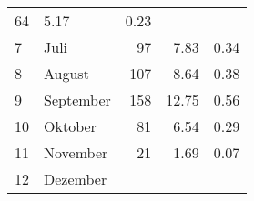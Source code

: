 \begin{longtable}{lXrrr}
       \num{64} &
       \num[round-mode=places,round-precision=2]{5.17} &
         \num[round-mode=places,round-precision=2]{0.23} \\

     7 &
     \multicolumn{1}{X}{ Juli   } &


       \num{97} &
       \num[round-mode=places,round-precision=2]{7.83} &
         \num[round-mode=places,round-precision=2]{0.34} \\

     8 &
     \multicolumn{1}{X}{ August   } &


       \num{107} &
       \num[round-mode=places,round-precision=2]{8.64} &
         \num[round-mode=places,round-precision=2]{0.38} \\

     9 &
     \multicolumn{1}{X}{ September   } &


       \num{158} &
       \num[round-mode=places,round-precision=2]{12.75} &
         \num[round-mode=places,round-precision=2]{0.56} \\

     10 &
     \multicolumn{1}{X}{ Oktober   } &


       \num{81} &
       \num[round-mode=places,round-precision=2]{6.54} &
         \num[round-mode=places,round-precision=2]{0.29} \\

     11 &
     \multicolumn{1}{X}{ November   } &


       \num{21} &
       \num[round-mode=places,round-precision=2]{1.69} &
         \num[round-mode=places,round-precision=2]{0.07} \\

     12 &
     \multicolumn{1}{X}{ Dezember   } &



\end{longtable}
